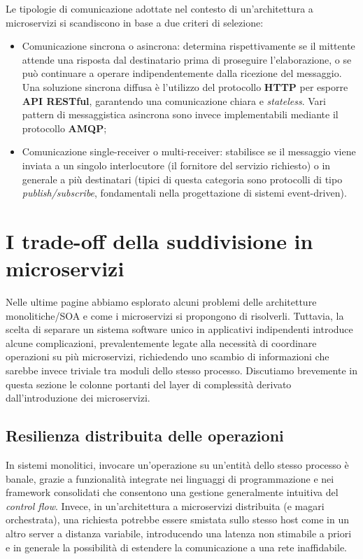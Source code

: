 Le tipologie di comunicazione adottate nel contesto di un'architettura a microservizi si scandiscono in base a due criteri di selezione\cite[19]{Thesis_microservices}:
\begin{itemize}
  \item Comunicazione sincrona o asincrona: determina rispettivamente se il mittente attende una risposta dal destinatario prima di proseguire l'elaborazione, o se può continuare a operare indipendentemente dalla ricezione del messaggio. Una soluzione sincrona diffusa è l'utilizzo del protocollo \textbf{HTTP} per esporre \textbf{API RESTful}, garantendo una comunicazione chiara e \emph{stateless}. Vari pattern di messaggistica asincrona sono invece implementabili mediante il protocollo \textbf{AMQP};
  \item Comunicazione single-receiver o multi-receiver: stabilisce se il messaggio viene inviata a un singolo interlocutore (il fornitore del servizio richiesto) o in generale a più destinatari (tipici di questa categoria sono protocolli di tipo \emph{publish/subscribe}, fondamentali nella progettazione di sistemi event-driven).
\end{itemize}

\section{I trade-off della suddivisione in microservizi}
Nelle ultime pagine abbiamo esplorato alcuni problemi delle architetture monolitiche/SOA e come i microservizi si propongono di risolverli. Tuttavia, la scelta di separare un sistema software unico in applicativi indipendenti introduce alcune complicazioni, prevalentemente legate alla necessità di coordinare operazioni su più microservizi, richiedendo uno scambio di informazioni che sarebbe invece triviale tra moduli dello stesso processo.
Discutiamo brevemente in questa sezione le colonne portanti del layer di complessità derivato dall'introduzione dei microservizi.

\subsection{Resilienza distribuita delle operazioni}
In sistemi monolitici, invocare un'operazione su un'entità dello stesso processo è banale, grazie a funzionalità integrate nei linguaggi di programmazione e nei framework consolidati che consentono una gestione generalmente intuitiva del \emph{control flow}.
Invece, in un'architettura a microservizi distribuita (e magari orchestrata), una richiesta potrebbe essere smistata sullo stesso host come in un altro server a distanza variabile, introducendo una latenza non stimabile a priori e in generale la possibilità di estendere la comunicazione a una rete inaffidabile.

